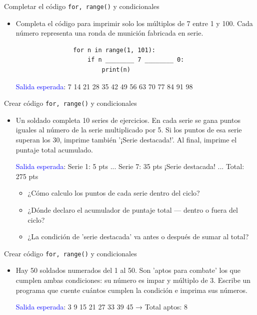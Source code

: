 \documentclass{beamer}
\begin{document}
    \begin{frame}[fragile, t]{Completar el código \texttt{for, range()} y condicionales}
        \begin{itemize}
            \item Completa el código para imprimir solo los múltiplos de 7 entre 1 y 100. Cada número representa una ronda de munición fabricada en serie.
            \begin{verbatim}
                for n in range(1, 101):
                    if n ________ 7 ________ 0:
                        print(n)
            \end{verbatim}
            \textcolor{blue}{Salida esperada}: 7   14   21   28   35   42   49   56   63   70   77   84   91   98
        \end{itemize}
    \end{frame}

    \begin{frame}[fragile, t]{Crear código \texttt{for, range()} y condicionales}
        \begin{itemize}
            \item Un soldado completa 10 series de ejercicios. En cada serie se gana puntos iguales al número de la serie multiplicado por 5. Si los puntos de esa serie superan los 30, imprime también '¡Serie destacada!'. Al final, imprime el puntaje total acumulado.
            
            \textcolor{blue}{Salida esperada}: Serie 1: 5 pts  ...  Serie 7: 35 pts  ¡Serie destacada!  ...  Total: 275 pts
            
            \begin{itemize}
                \item ¿Cómo calculo los puntos de cada serie dentro del ciclo?
                \item ¿Dónde declaro el acumulador de puntaje total — dentro o fuera del ciclo?
                \item ¿La condición de 'serie destacada' va antes o después de sumar al total?
            \end{itemize}
        \end{itemize}
    \end{frame}

    \begin{frame}[fragile,t]{Crear código \texttt{for, range()} y condicionales}
        \begin{itemize}
            \item Hay 50 soldados numerados del 1 al 50. Son 'aptos para combate' los que cumplen ambas condiciones: su número es impar y múltiplo de 3. Escribe un programa que cuente cuántos cumplen la condición e imprima sus números.
        
            \textcolor{blue}{Salida esperada}: 3   9   15   21   27   33   39   45  →  Total aptos: 8
        \end{itemize}
    \end{frame}
\end{document}
